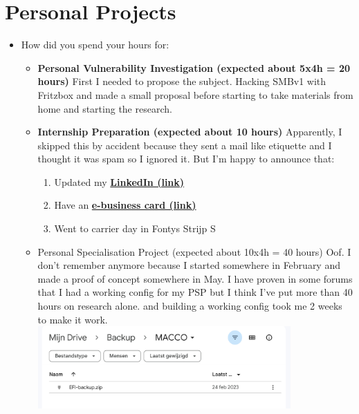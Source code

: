 \documentclass[12pt, letterpaper]{article}
\begin{document}
\section{Personal Projects}
\begin{itemize}
\item How did you spend your hours for:
\begin{itemize}
\item \textbf{Personal Vulnerability Investigation (expected about 5x4h = 20 hours)}
\hfill\break
\hfill\break
First I needed to propose the subject. Hacking SMBv1 with Fritzbox and made a small proposal before starting to take materials from home and starting the research.
\item \textbf{Internship Preparation (expected about 10 hours)}
\hfill\break
\hfill\break
Apparently, I skipped this by accident because they sent a mail like etiquette and I thought it was spam so I ignored it. But I'm happy to announce that:
\begin{enumerate}
    \item Updated my \textbf{\href{https://www.linkedin.com/in/kostapoum/}{LinkedIn (link)}}
    \item Have an \textbf{\href{https://poumpouridis.carrd.co}{ e-business card (link)}}
    \item Went to carrier day in Fontys Strijp S
\end{enumerate}
\item Personal Specialisation Project (expected about 10x4h = 40 hours)
\hfill\break
\hfill\break
Oof. I don't remember anymore because I started somewhere in February and made a proof of concept somewhere in May. I have proven in some forums that I had a working config for my PSP but I think I've put more than 40 hours on research alone. and building a working config took me 2 weeks to make it work.
\hfill\break
\hfill\break
\includegraphics[width=0.8\textwidth]{fotos/Portfolio/Gdrive Marco backup.jpeg}
\end{itemize}
\end{itemize}

\newpage
\end{document}
